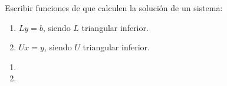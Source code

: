 \begin{enunciado}{\ejercicio}
  Escribir funciones de \python que calculen la solución de un sistema:
  \begin{enumerate}[label=(\alph*)]
    \item $Ly = b$, siendo $L$ triangular inferior.
    \item $Ux = y$, siendo $U$ triangular inferior.
  \end{enumerate}
\end{enunciado}

\copyPaste
\begin{enumerate}[label=(\alph*)]
  \item
  \item
\end{enumerate}

\begin{aportes}
  \item {}
\end{aportes}
